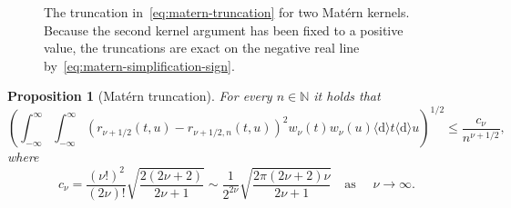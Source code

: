 \documentclass{article}
\newcommand{\mathd}{\mathrm{d}}
\newtheorem{proposition}{Proposition}
{\theorembodyfont{\rmfamily}\newtheorem{remark}{Remark}}
\newcommand{\N}{\mathbb{N}}
\newcommand{\dif}{ \langle \mathd \rangle }
\begin{document}
\begin{figure}[h]
  \begin{center}
    \label{fig:matern-truncations}
  \end{center}
  \caption{The truncation in~\eqref{eq:matern-truncation} for two Mat{\'e}rn
  kernels. Because the second kernel argument has been fixed to a positive
  value, the truncations are exact on the negative real line
  by~\eqref{eq:matern-simplification-sign}.}
\end{figure}

\begin{proposition}
  [Mat{\'e}rn truncation]\label{prop:matern-truncation-error}For every $n \in
  \N$ it holds that
  \[ \left( \int_{- \infty}^{\infty} \int_{- \infty}^{\infty} (r_{\nu + 1 / 2}
     (t, u) - r_{\nu + 1 / 2, n} (t, u))^2 w_{\nu} (t) w_{\nu} (u) \dif t \dif
     u \right)^{1 / 2} \leq \frac{c_{\nu}}{n^{\nu + 1 / 2}}, \]
  where
  \[ c_{\nu} = \frac{(\nu !)^2}{(2 \nu) !}  \sqrt{\frac{2 (2 \nu + 2)}{2 \nu +
     1}} \sim \frac{1}{2^{2 \nu}}  \sqrt{\frac{2 \pi (2 \nu + 2) \nu}{2 \nu +
     1}}  \quad \text{as } \quad \nu \to \infty . \]
\end{proposition}
\end{document}
